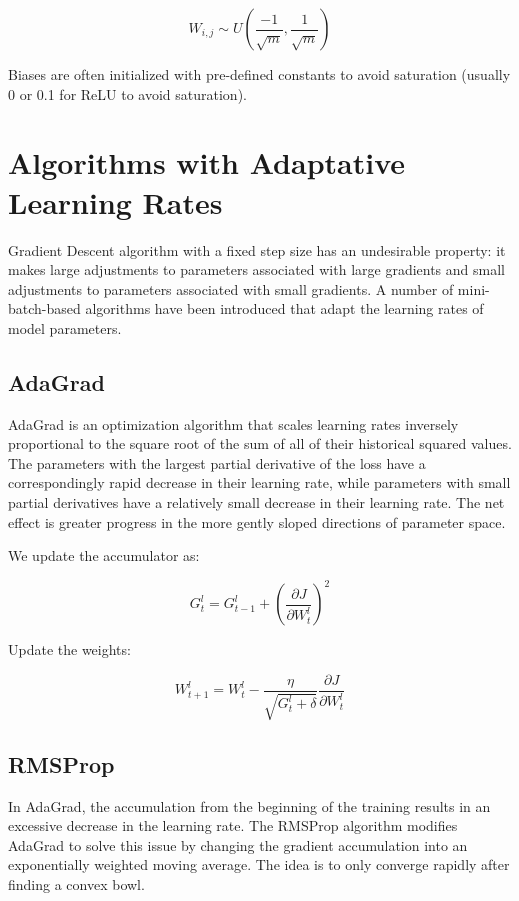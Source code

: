 $$ W_{i, j} \sim U \left(  \frac{-1}{\sqrt{m}}, \frac{1}{\sqrt{m}} \right) $$


\noindent Biases are often initialized with pre-defined constants to avoid saturation (usually 0 or 0.1 for ReLU to avoid saturation).

\section{Algorithms with Adaptative Learning Rates}

Gradient Descent algorithm with a fixed step size has an undesirable property: it makes large adjustments to parameters associated with large gradients and small adjustments to parameters associated with small gradients. A number of mini-batch-based algorithms have been introduced that adapt the learning rates of model parameters.

\subsection{AdaGrad}

AdaGrad is an optimization algorithm that scales learning rates inversely proportional to the square root of the sum of all of their historical squared values. The parameters with the largest partial derivative of the loss have a correspondingly rapid decrease in their learning rate, while parameters with small partial derivatives have a relatively small decrease in their learning rate. The net effect is greater progress in the more gently sloped directions of parameter space.

\noindent We update the accumulator as:

$$ G_{t}^{l} = G_{t-1}^{l} + \left( \frac{\partial J}{\partial W_{t}^{l}}  \right)^2  $$

\noindent Update the weights:

$$ W_{t+1}^{l} = W_{t}^{l} - \frac{\eta}{\sqrt{G_{t}^{l} + \delta}} \frac{\partial J}{\partial W_{t}^{l}} $$

\subsection{RMSProp}

In AdaGrad, the accumulation from the beginning of the training results in an excessive decrease in the learning rate. The RMSProp algorithm modifies AdaGrad to solve this issue by changing the gradient accumulation into an exponentially weighted moving average. The idea is to only converge rapidly after finding a convex bowl.

